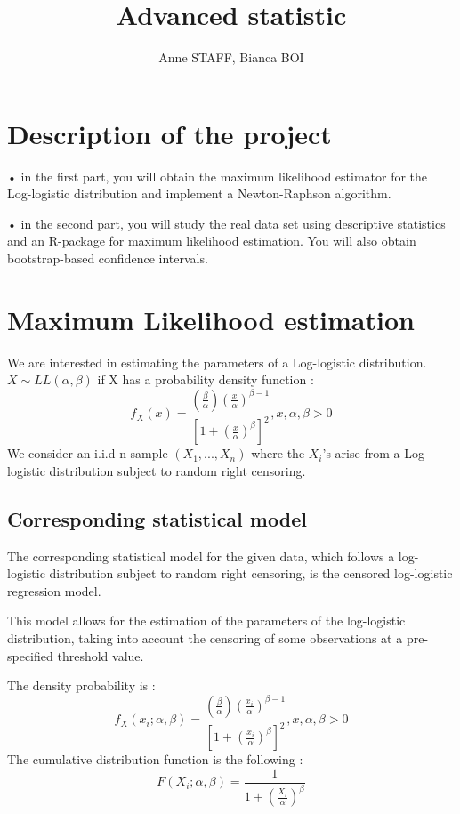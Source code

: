 \documentclass[
]{article}
\title{Advanced statistic}
\author{Anne STAFF, Bianca BOI}
\date{}
\begin{document}
\maketitle

\hypertarget{description-of-the-project}{%
\section{Description of the project}\label{description-of-the-project}}

• in the first part, you will obtain the maximum likelihood estimator
for the Log-logistic distribution and implement a Newton-Raphson
algorithm.

• in the second part, you will study the real data set using descriptive
statistics and an R-package for maximum likelihood estimation. You will
also obtain bootstrap-based confidence intervals.

\hypertarget{maximum-likelihood-estimation}{%
\section{Maximum Likelihood
estimation}\label{maximum-likelihood-estimation}}

We are interested in estimating the parameters of a Log-logistic
distribution. \(X \sim LL(\alpha , \beta)\) if X has a probability
density function :
\[f_X (x) = \frac{(\frac{\beta}{\alpha})(\frac{x}{\alpha})^{\beta-1}}{[1+(\frac{x}{\alpha})^\beta]^2} , x,\alpha,\beta > 0\]
We consider an i.i.d n-sample \((X_1,...,X_n)\) where the \(X_i\)'s
arise from a Log-logistic distribution subject to random right
censoring.

\hypertarget{corresponding-statistical-model}{%
\subsection{Corresponding statistical
model}\label{corresponding-statistical-model}}

The corresponding statistical model for the given data, which follows a
log-logistic distribution subject to random right censoring, is the
censored log-logistic regression model.

This model allows for the estimation of the parameters of the
log-logistic distribution, taking into account the censoring of some
observations at a pre-specified threshold value.

The density probability is :
\[f_X (x_i; \alpha,\beta) = \frac{(\frac{\beta}{\alpha})(\frac{x_i}{\alpha})^{\beta-1}}{[1+(\frac{x_i}{\alpha})^\beta]^2} , x,\alpha,\beta > 0\]
The cumulative distribution function is the following :
\[F(X_i; \alpha,\beta) = \frac{1}{1 +(\frac{X_i}{\alpha})^\beta} \]
\end{document}
